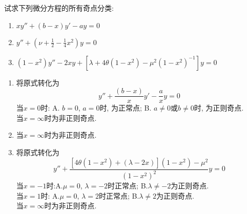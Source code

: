 \begin{problem}[习题4.1]
试求下列微分方程的所有奇点分类:
\begin{enumerate}
\item $xy''+(b-x)y'-ay=0$
\item $y''+(\nu + \frac{1}{2}-\frac{1}{4}x^2)y=0$
\item $(1-x^2)y''-2xy+[\lambda+4\theta(1-x^2)-\mu^2(1-x^2)^{-1}]y=0$
\end{enumerate}
\end{problem}

\begin{solution}
\begin{enumerate}
\item 将原式转化为
\[
y''+\frac{(b-x)}{x}y'-\frac{a}{x}y=0
\]
当$x=0$时: A. $b=0$, $a=0$时, 为正常点; 
B. $a\neq0$或$b\neq0$时, 为正则奇点.\\
当$x=\infty$时为非正则奇点.
\item 当$x=\infty$时为非正则奇点.
\item 将原式转化为
\[
y''+\frac{[4\theta(1-x^{2})+(\lambda-2x)](1-x^{2})-\mu^{2}}{(1-x^{2})^{2}}y=0
\]
当$x=-1$时:A.$\mu=0$, $\lambda=-2$时正常点; B.$\lambda\neq-2$为正则奇点.\\
当$x=1$时: A.$\mu=0$, $\lambda=2$时正常点; B.$\lambda\neq2$为正则奇点. \\ 当$x=\infty$时为非正则奇点.\end{enumerate}
\end{solution} 
